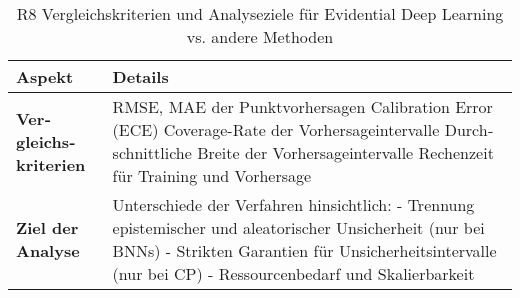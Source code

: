 \begin{otherlanguage}{ngerman}
\begin{table}[htbp]
\centering
\footnotesize
\begin{tabularx}{\textwidth}{|l|X|}
\hline
\textbf{Aspekt} & \textbf{Details} \\ \hline

\textbf{Vergleichskriterien} &
RMSE, MAE der Punktvorhersagen \newline
Calibration Error (ECE) \newline
Coverage-Rate der Vorhersageintervalle \newline
Durchschnittliche Breite der Vorhersageintervalle \newline
Rechenzeit für Training und Vorhersage \\ \hline

\textbf{Ziel der Analyse} &
Unterschiede der Verfahren hinsichtlich: \newline
- Trennung epistemischer und aleatorischer Unsicherheit (nur bei BNNs) \newline
- Strikten Garantien für Unsicherheitsintervalle (nur bei CP) \newline
- Ressourcenbedarf und Skalierbarkeit \\ \hline

\end{tabularx}
\caption{R8 Vergleichskriterien und Analyseziele für Evidential Deep Learning vs. andere Methoden}
\label{tab:vergleichskriterien}
\end{table}





\end{otherlanguage}
